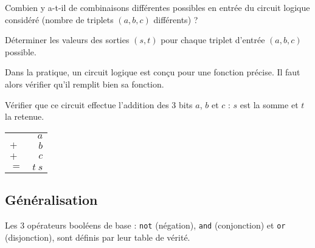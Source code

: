 \begin{question}
Combien y a-t-il de combinaisons différentes possibles en entrée du circuit logique considéré 
(nombre de triplets $(a,b,c)$ différents) ?
\end{question}

\begin{question}
Déterminer les valeurs des sorties $(s,t)$ pour chaque triplet d'entrée $(a,b,c)$ possible.
\end{question}

Dans la pratique, un circuit logique est conçu pour une fonction précise.
Il faut alors vérifier qu'il remplit bien sa fonction.
\begin{question}
Vérifier que ce circuit effectue l'addition des 3 bits 
$a$, $b$ et $c$ : $s$ est la somme et $t$ la retenue.

\begin{tabular}{lr}
    & $a$ \\
$+$ & $b$ \\
$+$ & $c$ \\
\hline
$=$ & $t\ s$
\end{tabular}
\end{question}

\newpage
\subsection{Généralisation}
Les 3 opérateurs booléens de base :
\texttt{not} (négation), \texttt{and} (conjonction) et 
\texttt{or} (disjonction), sont définis par leur table de vérité.


